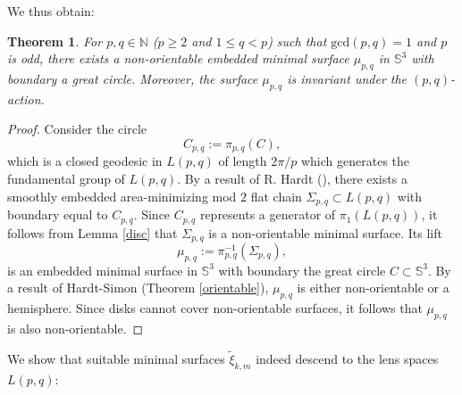 \documentclass[11pt, reqno]{amsart}
\newtheorem{thm}{Theorem}[section]
\numberwithin{equation}{section}
\begin{document}
We thus obtain: 
\begin{thm}
For $p,q\in\mathbb{N}$ ($p\geq 2$ and $1\leq q< p$) such that $\mbox{gcd}(p,q)=1$ and $p$ is odd, there exists a non-orientable embedded minimal surface $\mu_{p,q}$ in $\mathbb{S}^3$ with boundary a great circle.  Moreover, the surface $\mu_{p,q}$ is invariant under the $(p,q)$-action.
\end{thm}
\begin{proof}
Consider the circle \begin{equation}C_{p,q}:=\pi_{p,q}(C),\end{equation} which is a closed geodesic in $L(p,q)$ of length $2\pi/p$ which generates the fundamental group of $L(p,q)$.  By a result of R. Hardt (\cite{Hardt}), there exists a smoothly embedded area-minimizing mod $2$ flat chain $\Sigma_{p,q}\subset L(p,q)$ with boundary equal to $C_{p,q}$.  Since $C_{p,q}$ represents a generator of $\pi_1(L(p,q))$, it follows from Lemma \ref{disc} that $\Sigma_{p,q}$ is a non-orientable minimal surface. Its lift
\begin{equation}
\mu_{p,q}:=\pi^{-1}_{p,q}(\Sigma_{p,q}), 
\end{equation}
is an embedded minimal surface in $\mathbb{S}^3$ with boundary the great circle $C\subset\mathbb{S}^3$.  By a result of Hardt-Simon (Theorem \ref{orientable}), $\mu_{p,q}$ is either non-orientable or a hemisphere.  
Since disks cannot cover non-orientable surfaces, it follows that $\mu_{p,q}$ is also non-orientable.  

\end{proof}

We show that suitable minimal surfaces $\tilde{\xi}_{k,m}$ indeed descend to the lens spaces $L(p,q)$:
\end{document}
